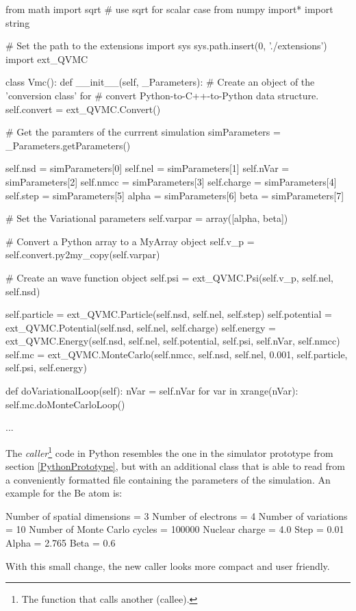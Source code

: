\begin{Python}

from math import sqrt   # use sqrt for scalar case
from numpy import*
import string

# Set the path to the extensions
import sys
sys.path.insert(0, './extensions')
import ext_QVMC

class Vmc():
  def __init__(self, _Parameters):
    # Create an object of the 'conversion class' for 
    # convert Python-to-C++-to-Python data structure.
    self.convert = ext_QVMC.Convert()
    
    # Get the paramters of the currrent simulation
    simParameters 	= _Parameters.getParameters()
    
    self.nsd 	  	= simParameters[0]
    self.nel 		= simParameters[1]
    self.nVar 		= simParameters[2]
    self.nmcc		= simParameters[3]
    self.charge		= simParameters[4]
    self.step 		= simParameters[5]
    alpha		= simParameters[6]
    beta		= simParameters[7]
    
    # Set the Variational parameters
    self.varpar = array([alpha, beta])
    
    # Convert a Python array to a MyArray object
    self.v_p = self.convert.py2my_copy(self.varpar)
\end{Python}

\begin{Python}
    
    # Create an wave function object
    self.psi 		= ext_QVMC.Psi(self.v_p, self.nel, self.nsd)
    
    self.particle 	= ext_QVMC.Particle(self.nsd, self.nel, self.step)
    self.potential 	= ext_QVMC.Potential(self.nsd, self.nel, self.charge)
    self.energy 	= ext_QVMC.Energy(self.nsd, self.nel, self.potential, self.psi, self.nVar, self.nmcc)
    self.mc		= ext_QVMC.MonteCarlo(self.nmcc, self.nsd, self.nel, 0.001, self.particle, self.psi, self.energy) 
    
  def doVariationalLoop(self):
    nVar = self.nVar
    for var in xrange(nVar):
      self.mc.doMonteCarloLoop()
  
 ...
\end{Python}
\noindent
The \emph{caller}\footnote{The function that calls another (callee).} code in Python resembles the one in the simulator prototype from section \ref{PythonPrototype}, but with an additional class  that is able to read from a conveniently formatted file containing the parameters of the simulation. An example for the Be atom is:
\begin{src}
Number of spatial dimensions 	= 3
Number of electrons 		= 4
Number of variations		= 10
Number of Monte Carlo cycles  	= 100000
Nuclear charge  		= 4.0
Step				= 0.01
Alpha				= 2.765
Beta				= 0.6
\end{src}
\noindent
With this small change, the new caller looks more compact and user friendly.


